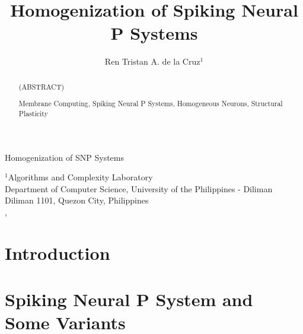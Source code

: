 \documentclass[runningheads,a4paper]{llncs}
\newcommand{\keywords}[1]{\par\addvspace\baselineskip
\noindent\keywordname\enspace\ignorespaces#1}
\theoremstyle{definition}
\begin{document}
\mainmatter

\title
{
Homogenization of Spiking Neural P Systems
}

\titlerunning
{
Homogenization of SNP Systems
}


\author
{
Ren Tristan A. de la Cruz$^1$
}



\institute
{
$^1$Algorithms and Complexity Laboratory \\
Department of Computer Science, University of the Philippines - Diliman\\
Diliman 1101, Quezon City, Philippines    \\
\mailsa ,
}




\maketitle


\begin{abstract}

(ABSTRACT)

\keywords{Membrane Computing, 
          Spiking Neural P Systems, 
          Homogeneous Neurons,
          Structural Plasticity}
\end{abstract}



\section{Introduction}


\section{Spiking Neural P System and Some Variants} \label{sec-snps}


\end{document}
